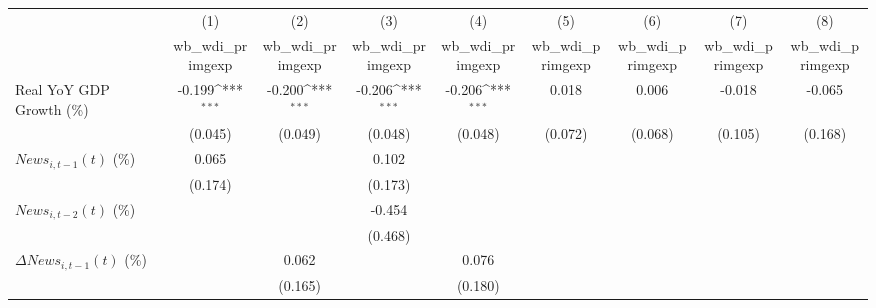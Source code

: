 {
\def\sym#1{\ifmmode^{#1}\else\(^{#1}\)\fi}
\begin{tabular}{l*{8}{c}}
\toprule
                    &\multicolumn{1}{c}{(1)}&\multicolumn{1}{c}{(2)}&\multicolumn{1}{c}{(3)}&\multicolumn{1}{c}{(4)}&\multicolumn{1}{c}{(5)}&\multicolumn{1}{c}{(6)}&\multicolumn{1}{c}{(7)}&\multicolumn{1}{c}{(8)}\\
                    &\multicolumn{1}{c}{wb_wdi_primgexp}&\multicolumn{1}{c}{wb_wdi_primgexp}&\multicolumn{1}{c}{wb_wdi_primgexp}&\multicolumn{1}{c}{wb_wdi_primgexp}&\multicolumn{1}{c}{wb_wdi_primgexp}&\multicolumn{1}{c}{wb_wdi_primgexp}&\multicolumn{1}{c}{wb_wdi_primgexp}&\multicolumn{1}{c}{wb_wdi_primgexp}\\
\midrule
Real YoY GDP Growth (\%)&      -0.199\sym{***}&      -0.200\sym{***}&      -0.206\sym{***}&      -0.206\sym{***}&       0.018         &       0.006         &      -0.018         &      -0.065         \\
                    &     (0.045)         &     (0.049)         &     (0.048)         &     (0.048)         &     (0.072)         &     (0.068)         &     (0.105)         &     (0.168)         \\
\addlinespace
$ News_{i,t-1}(t)$ (\%)&       0.065         &                     &       0.102         &                     &                     &                     &                     &                     \\
                    &     (0.174)         &                     &     (0.173)         &                     &                     &                     &                     &                     \\
\addlinespace
$ News_{i,t-2}(t)$ (\%)&                     &                     &      -0.454         &                     &                     &                     &                     &                     \\
                    &                     &                     &     (0.468)         &                     &                     &                     &                     &                     \\
\addlinespace
$ \Delta News_{i,t-1}(t)$ (\%)&                     &       0.062         &                     &       0.076         &                     &                     &                     &                     \\
                    &                     &     (0.165)         &                     &     (0.180)         &                     &                     &                     &                     \\

\end{tabular}}

